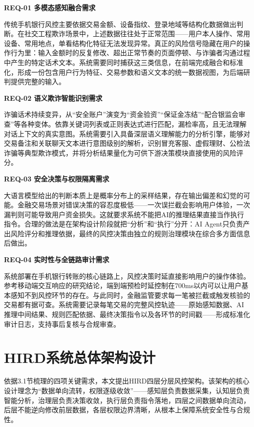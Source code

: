 \documentclass{xduugthesis}
\begin{document}
\textbf{REQ-01 多模态感知融合需求}

传统手机银行风控主要依据交易金额、设备指纹、登录地域等结构化数据做出判断。在社交工程欺诈场景中，上述数据往往处于正常范围——用户本人操作、常用设备、常用地点，单看结构化特征无法发现异常。真正的风险信号隐藏在用户的操作行为里：输入金额时的反复修改、超出正常节奏的页面停顿、与诈骗者沟通过程中产生的特定话术文本。系统需要同时捕获这三类信息，在前端完成融合和标准化，形成一份包含用户行为特征、交易参数和语义文本的统一数据视图，为后端研判提供完整的输入。

\textbf{REQ-02 语义欺诈智能识别需求}

诈骗话术持续变异，从“安全账户”演变为“资金验资”“保证金冻结”“配合银监会审查”等各种变体。依靠关键词列表或正则表达式进行匹配，漏检率高，且无法理解对话上下文的真实意图。系统需要引入具备深层语义理解能力的分析引擎，能够对交易备注和关联聊天文本进行意图级别的解析，识别冒充客服、虚假理财、公检法诈骗等典型欺诈模式，并将分析结果量化为可供下游决策模块直接使用的风险评分。

\textbf{REQ-03 安全决策与权限隔离需求}

大语言模型给出的判断本质上是概率分布上的采样结果，存在输出偏差和幻觉的可能。金融交易场景对错误决策的容忍度极低——一次误拦截会影响用户体验，一次漏判则可能导致用户资金损失。这就要求系统不能把AI的推理结果直接当作执行指令。合理的做法是在架构设计阶段就把“分析”和“执行”分开：AI Agent只负责产出风险评分和推理依据，最终的风控决策由独立的规则治理模块在综合多方面信息后做出。

\textbf{REQ-04 实时性与全链路审计需求}

系统部署在手机银行转账的核心链路上，风控决策时延直接影响用户的操作体验。参考移动端交互响应的研究结论，端到端预检时延控制在700ms以内可以让用户基本感知不到风控环节的存在。与此同时，金融监管要求每一笔被拦截或触发核验的交易都有据可查。系统需要记录每笔交易的完整风控轨迹——原始感知数据、AI推理中间结果、规则匹配依据、最终决策指令以及各环节的时间戳——形成标准化审计日志，支持事后复核与合规审查。

\section{HIRD系统总体架构设计}

依据3.1节梳理的四项关键需求，本文提出HIRD四层分层风控架构。该架构的核心设计理念为“数据单向流转，权限逐级收敛”——感知层负责数据采集，认知层负责智能分析，治理层负责决策收敛，执行层负责指令落地，四层之间数据单向流动，后层不能逆向修改前层数据，各层权限边界清晰，从根本上保障系统安全性与合规性。
\end{document}
